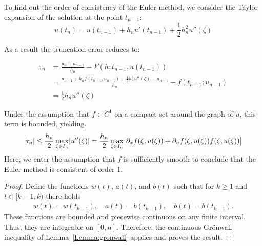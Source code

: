 \begin{example}
  To find out the order of consistency of the Euler method, we 
  consider the Taylor expansion of the solution at the point $t_{n-1}$:
  \begin{equation*}
    u(t_n) = u(t_{n-1}) + h_n u'(t_{n-1}) + \frac12 h_n^2 u''(\zeta)
  \end{equation*}
  
  As a result the truncation error reduces to:
  
  \begin{align*}
    \tau_n & = \frac{u_n - u_{n-1}}{h_n} - F(h;t_{n-1},u(t_{n-1})) \\
    & = \frac{u_{n-1} + h_n f(t_{n-1},u_{n-1})
      + \frac12 h_n^2 u''(\zeta) - u_{n-1}}{h_n} - f(t_{n-1}; u_{n-1}) \\
    & = \frac12 h_n u''(\zeta)
  \end{align*}


Under the assumption that $f \in C^1$ on a compact set around the graph
of $u$, this term is bounded, yielding.
\begin{gather*}
  | \tau_n | \le \frac{h_n}{2} \max_{\zeta\in I_n} \lvert u''(\zeta)\rvert
  = \frac{h_n}{2} \max_{\zeta\in I_n} \bigl|\partial_x f(\zeta,
    u(\zeta)) + \partial_u  f(\zeta, u(\zeta)) f(\zeta, u(\zeta))\bigr|
\end{gather*}
Here, we enter the assumption that $f$ is sufficiently smooth to
conclude that the Euler method is consistent of order 1.
\end{example}



\begin{proof}
  Define the functions $w(t)$, $a(t)$, and $b(t)$ such that for $k\ge
  1$ and $t\in [k-1,k)$ there holds
  \begin{gather*}
    w(t) = w(t_{k-1}),\quad
    a(t) = b(t_{k-1}),\quad
    b(t) = b(t_{k-1}).
  \end{gather*}
  These functions are bounded and piecewise continuous on any finite
  interval. Thus, they are integrable on $[0,n]$. Therefore, the
  continuous Grönwall inequality of Lemma~\ref{Lemma:gronwall} applies
  and proves the result.
\end{proof}

